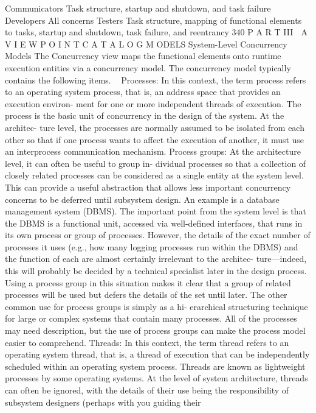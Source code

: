 Communicators
 Task structure, startup and shutdown, and task failure
Developers
 All concerns
Testers
 Task structure, mapping of functional elements to tasks, startup
and shutdown, task failure, and reentrancy
340
 P A R T III  A V I E W P O I N T C A T A L O G
M ODELS
System-Level Concurrency Models
The Concurrency view maps the functional elements onto runtime execution
entities via a concurrency model. The concurrency model typically contains
the following items.
Processes: In this context, the term process refers to an operating system
process, that is, an address space that provides an execution environ-
ment for one or more independent threads of execution. The process is
the basic unit of concurrency in the design of the system. At the architec-
ture level, the processes are normally assumed to be isolated from each
other so that if one process wants to affect the execution of another, it
must use an interprocess communication mechanism.
Process groups: At the architecture level, it can often be useful to group in-
dividual processes so that a collection of closely related processes can be
considered as a single entity at the system level. This can provide a useful
abstraction that allows less important concurrency concerns to be deferred
until subsystem design. An example is a database management system
(DBMS). The important point from the system level is that the DBMS is a
functional unit, accessed via well-defined interfaces, that runs in its own
process or group of processes. However, the details of the exact number of
processes it uses (e.g., how many logging processes run within the DBMS)
and the function of each are almost certainly irrelevant to the architec-
ture—indeed, this will probably be decided by a technical specialist later in
the design process. Using a process group in this situation makes it clear
that a group of related processes will be used but defers the details of the
set until later. The other common use for process groups is simply as a hi-
erarchical structuring technique for large or complex systems that contain
many processes. All of the processes may need description, but the use of
process groups can make the process model easier to comprehend.
Threads: In this context, the term thread refers to an operating system
thread, that is, a thread of execution that can be independently scheduled
within an operating system process. Threads are known as lightweight
processes by some operating systems. At the level of system architecture,
threads can often be ignored, with the details of their use being the
responsibility of subsystem designers (perhaps with you guiding their
